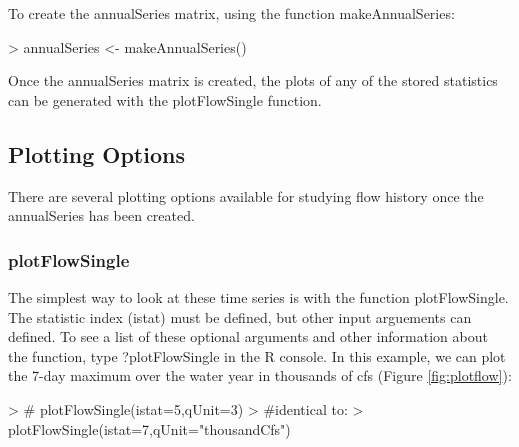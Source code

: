 \documentclass[a4paper,11pt]{article}
\begin{document}
To create the annualSeries matrix, using the function makeAnnualSeries:
\begin{Schunk}
\begin{Sinput}
> annualSeries <- makeAnnualSeries()
\end{Sinput}
\end{Schunk}

Once the annualSeries matrix is created, the plots of any of the stored statistics can be generated with the plotFlowSingle function.

\subsection{Plotting Options}
\label{sec:plotOptions}
There are several plotting options available for studying flow history once the annualSeries has been created.

\subsubsection{plotFlowSingle}
\label{sec:plotFlowSingle}
The simplest way to look at these time series is with the function plotFlowSingle. The statistic index (istat) must be defined, but other input arguements can defined. To see a list of these optional arguments and other information about the function, type ?plotFlowSingle in the R console. In this example, we can plot the 7-day maximum over the water year in thousands of cfs (Figure \ref{fig:plotflow}):


\begin{Schunk}
\begin{Sinput}
> # plotFlowSingle(istat=5,qUnit=3)
> #identical to:
> plotFlowSingle(istat=7,qUnit="thousandCfs")
\end{Sinput}
\end{Schunk}
\end{document}
